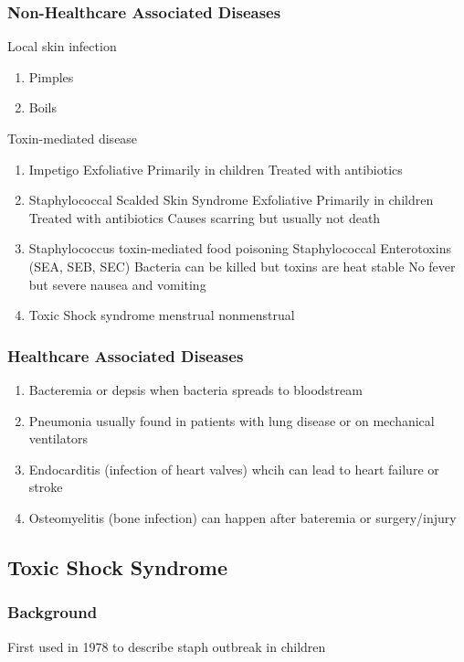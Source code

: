 \documentclass{notes}
\begin{document}
\subsubsection*{Non-Healthcare Associated Diseases}
Local skin infection
\begin{enumerate}
    \item Pimples
    \item Boils
\end{enumerate}

Toxin-mediated disease
\begin{enumerate}
    \item Impetigo
    \subitem Exfoliative
    \subitem Primarily in children
    \subitem Treated with antibiotics
    \item Staphylococcal Scalded Skin Syndrome
    \subitem Exfoliative
    \subitem Primarily in children
    \subitem Treated with antibiotics
    \subitem Causes scarring but usually not death
    \item Staphylococcus toxin-mediated food poisoning
    \subitem Staphylococcal Enterotoxins (SEA, SEB, SEC)
    \subitem Bacteria can be killed but toxins are heat stable
    \subitem No fever but severe nausea and vomiting
    \item Toxic Shock syndrome
    \subitem menstrual
    \subitem nonmenstrual
\end{enumerate}

\subsubsection*{Healthcare Associated Diseases}
\begin{enumerate}
    \item Bacteremia or depsis when bacteria spreads to bloodstream
    \item Pneumonia usually found in patients with lung disease or on mechanical ventilators
    \item Endocarditis (infection of heart valves) whcih can lead to heart failure or stroke
    \item Osteomyelitis (bone infection) can happen after bateremia or surgery/injury
\end{enumerate}

\subsection*{Toxic Shock Syndrome}
\subsubsection*{Background}
First used in 1978 to describe staph outbreak in children
\end{document}
